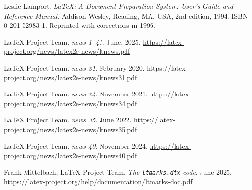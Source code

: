 \documentclass{ltnews}
\begin{document}
\begin{thebibliography}{9}\frenchspacing


Leslie Lamport.
\newblock \emph{{\LaTeX}: {A} Document Preparation System: User's Guide and Reference
  Manual}.
\newblock \mbox{Addison}-Wesley, Reading, MA, USA, 2nd edition, 1994.
\newblock ISBN 0-201-52983-1.
\newblock Reprinted with corrections in 1996.

 \LaTeX{} Project Team.
  \emph{\LaTeXe{} news 1--41}. June, 2025.
  \url{https://latex-project.org/news/latex2e-news/ltnews.pdf}

 \LaTeX{} Project Team.
  \emph{\LaTeXe{} news 31}. February 2020.
  \url{https://latex-project.org/news/latex2e-news/ltnews31.pdf}

 \LaTeX{} Project Team.
  \emph{\LaTeXe{} news 34}. November 2021.
  \url{https://latex-project.org/news/latex2e-news/ltnews34.pdf}

 \LaTeX{} Project Team.
  \emph{\LaTeXe{} news 35}. June 2022.
  \url{https://latex-project.org/news/latex2e-news/ltnews35.pdf}

 \LaTeX{} Project Team.
  \emph{\LaTeXe{} news 40}. November 2024.
  \url{https://latex-project.org/news/latex2e-news/ltnews40.pdf}

 Frank Mittelbach, \LaTeX{} Project Team.
  \emph{The \texttt{ltmarks.dtx} code}. June 2025.
  \url{https://latex-project.org/help/documentation/ltmarks-doc.pdf}

\end{thebibliography}
\end{document}

